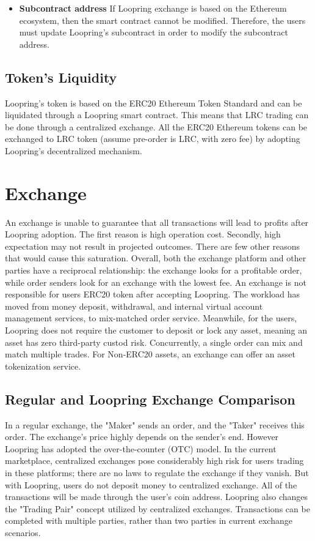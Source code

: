 \documentclass[UTF8,nofonts]{article}
\begin{document}
\begin{itemize}
   \item \textbf{Subcontract address} If Loopring exchange is based on the Ethereum ecosystem, then the smart contract cannot be modified. Therefore, the users must update Loopring's subcontract in order to modify the subcontract address.
 \end{itemize}


\subsection{Token's Liquidity}

Loopring's token is based on the ERC20 Ethereum Token Standard and can be liquidated through a Loopring smart contract. This means that LRC trading can be done through a centralized exchange. All the ERC20 Ethereum tokens can be exchanged to LRC token (assume pre-order is LRC, with zero fee) by adopting Loopring's decentralized mechanism.


\section{Exchange\label{sec: exchange}}

An exchange is unable to guarantee that all transactions will lead to profits after Loopring adoption. The first reason is high operation cost. Secondly, high expectation may not result in projected outcomes. There are few other reasons that would cause this saturation. Overall,  both the exchange platform and other parties have a reciprocal relationship: the exchange looks for a profitable order, while order senders look for an exchange with the lowest fee.
An exchange is not responsible for users ERC20 token after accepting Loopring. The workload has moved from money deposit, withdrawal,  and internal virtual account management services, to mix-matched order service. Meanwhile, for the users, Loopring does not require the customer to deposit or lock any asset, meaning an asset has zero third-party custod risk. Concurrently, a single order can mix and match multiple trades. For Non-ERC20 assets, an exchange can offer an asset tokenization service.

\subsection{Regular and Loopring Exchange Comparison}
In a regular exchange, the "Maker" sends an order, and the "Taker" receives this order. The exchange's price highly depends on the sender's end. However Loopring has adopted the over-the-counter (OTC) model.
In the current marketplace, centralized exchanges pose considerably high risk for users trading in these platforms; there are no laws to regulate the exchange if they vanish. But with Loopring, users do not deposit money to centralized exchange. All of the transactions will be made through the user's coin address.
Loopring also changes the "Trading Pair" concept utilized by centralized exchanges. Transactions can be completed with multiple parties, rather than two parties in current exchange scenarios.
\end{document}
